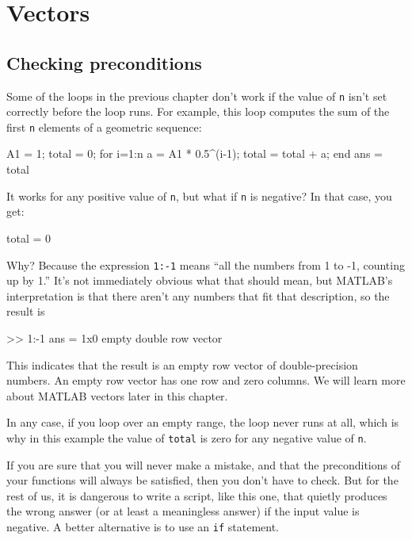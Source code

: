 \documentclass[
]{book}
\numberwithin{Answer}{chapter}
\numberwithin{Exercise}{chapter}
\begin{document}
\chapter{Vectors}
\label{chpt:vectors}

\section{Checking preconditions}


Some of the loops in the previous chapter don't work
if the value of {\tt n} isn't set correctly before the loop runs.
For example, this loop computes the sum of the first {\tt n} elements
of a geometric sequence:

\begin{code}
A1 = 1;
total = 0;
for i=1:n
    a = A1 * 0.5^(i-1);
    total = total + a;
end
ans = total
\end{code}

It works for any positive value of {\tt n}, but what if {\tt n}
is negative?  In that case, you get:

\begin{code}
total = 0
\end{code}

Why?  Because the expression {\tt 1:-1} means ``all the numbers
from 1 to -1, counting up by 1.''  
It's not immediately obvious
what that should mean, but MATLAB's interpretation is that there
aren't any numbers that fit that description, so the result is


\begin{code}
>> 1:-1
ans = 1x0 empty double row vector
\end{code}

This indicates that the result is an empty row vector of 
double-precision numbers.  An empty row vector has one row and zero columns.  We will learn more about MATLAB vectors later in this
chapter.


In any case, if you loop over an empty range,
the loop never runs at all, which is why in this example the
value of {\tt total} is zero for any negative value of {\tt n}.

If you are sure that you will never make a mistake, and that the
preconditions of your functions will always be satisfied, then you
don't have to check.  But for the rest of us, it is dangerous to write
a script, like this one, that quietly produces the wrong answer (or
at least a meaningless answer) if the input value is negative.
A better alternative is to use an {\tt if} statement.
\end{document}
